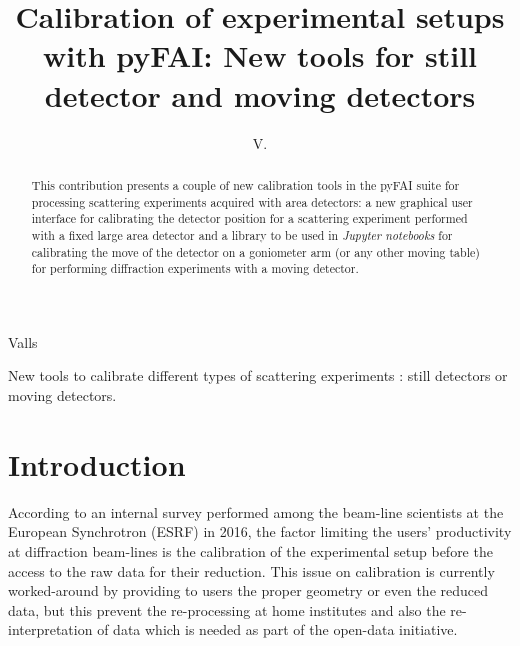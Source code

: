 \documentclass[preprint, pdf]{iucr}              %
\begin{document}

\title{Calibration of experimental setups with {pyFAI}: New tools for still
detector and moving detectors}

 \author[a]{V.}{Valls}
 
 





\maketitle                        %

\begin{synopsis}
New tools to calibrate different types of scattering experiments : still
detectors or moving detectors.
\end{synopsis}

\begin{abstract}


This contribution presents a couple of new calibration tools in the pyFAI suite
for processing scattering experiments acquired with area detectors:
a new graphical user interface for calibrating the detector position for a 
scattering experiment performed with a fixed large area detector and
a library to be used in \textit{Jupyter notebooks} for calibrating the move of the
detector on a goniometer arm (or any other moving table) for performing
diffraction experiments with a moving detector.
\end{abstract}


\section{Introduction}

According to an internal survey performed among the beam-line scientists at
the European Synchrotron (ESRF) in 2016, the factor limiting the users'
productivity at diffraction beam-lines is the calibration of the experimental
setup before the access to the raw data for their reduction. 
This issue on calibration is currently worked-around by providing to users the
proper geometry or even the reduced data, but this prevent the
re-processing at home institutes and also the re-interpretation of data which
is needed as part of the open-data initiative.
\end{document}
